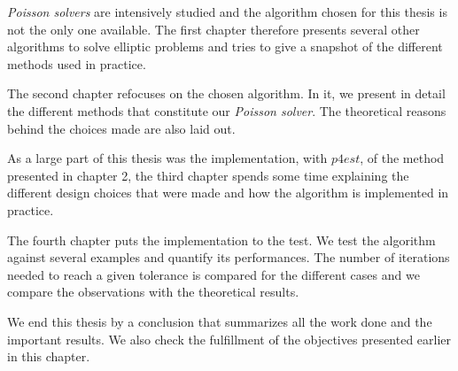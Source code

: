 \textit{Poisson solvers} are intensively studied and the algorithm chosen for this thesis is not the only one available. The first chapter therefore presents several other algorithms to solve elliptic problems and tries to give a snapshot of the different methods used in practice. 

The second chapter refocuses on the chosen algorithm. In it, we present in detail the different methods that constitute our \textit{Poisson solver}. The theoretical reasons behind the choices made are also laid out.

As a large part of this thesis was the implementation, with $p4est$, of the method presented in chapter 2, the third chapter spends some time explaining the different design choices that were made and how the algorithm is implemented in practice. 

The fourth chapter puts the implementation to the test. We test the algorithm against several examples and quantify its performances. The number of iterations needed to reach a given tolerance is compared for the different cases and we compare the observations with the theoretical results. 

We end this thesis by a conclusion that summarizes all the work done and the important results. We also check the fulfillment of the objectives presented earlier in this chapter.


















